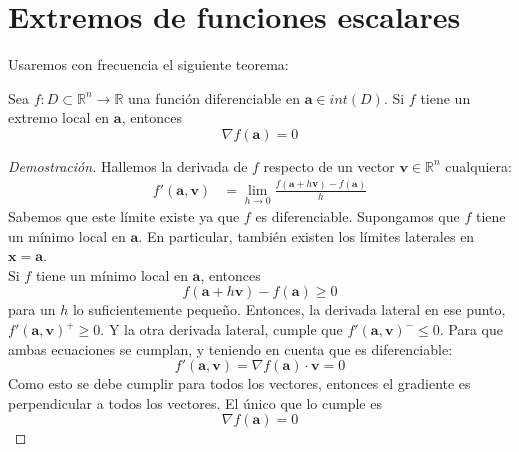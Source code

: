\documentclass{../Calculo.tex}
\begin{document}
\section{Extremos de funciones escalares}
Usaremos con frecuencia el siguiente teorema:
\begin{teorema}
Sea $f:D \subset \mathbb{R}^{n} \to \mathbb{R}$ una función diferenciable en $\mathbf{a} \in int(D)$. Si $f$ tiene un extremo local en $\mathbf{a}$, entonces
\[
	\nabla f(\mathbf{a}) = 0
\]
\end{teorema}
\begin{proof}[Demostración]
Hallemos la derivada de $f$ respecto de un vector $\mathbf{v} \in \mathbb{R}^{n}$ cualquiera:
\begin{equation}
	\begin{split}
		f'(\mathbf{a}, \mathbf{v}) &= \lim_{h \to 0} \frac{f(\mathbf{a}+h \mathbf{v})-f(\mathbf{a})}{h}
	\end{split}
\end{equation}
Sabemos que este límite existe ya que $f$ es diferenciable. Supongamos que $f$ tiene un mínimo local en $\mathbf{a}$. En particular, también existen los límites laterales en $\mathbf{x}=\mathbf{a}$.\\
Si $f$ tiene un mínimo local en $\mathbf{a}$, entonces
\[
	f(\mathbf{a}+h \mathbf{v})-f(\mathbf{a}) \geq 0
\]
para un $h$ lo suficientemente pequeño. Entonces, la derivada lateral en ese punto, $f'(\mathbf{a}, \mathbf{v})^{+} \geq 0$. Y la otra derivada lateral, cumple que $f'(\mathbf{a}, \mathbf{v})^{-} \leq 0$. Para que ambas ecuaciones se cumplan, y teniendo en cuenta que es diferenciable:
\[
	f'(\mathbf{a}, \mathbf{v})= \nabla f(\mathbf{a}) \cdot \mathbf{v} =0
\]
Como esto se debe cumplir para todos los vectores, entonces el gradiente es perpendicular a todos los vectores. El único que lo cumple es
\[
	\nabla f(\mathbf{a}) = 0
\]
\end{proof}
\end{document}
